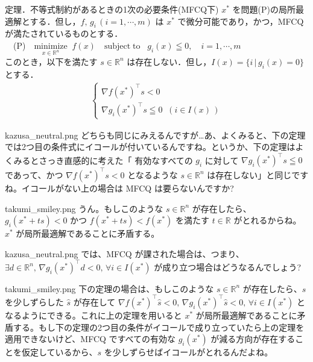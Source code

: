 \documentclass[b5paper,xelatex,ja=standard,10pt]{bxjsarticle}
\begin{document}
\begin{PROP}[colback=White]{定理．不等式制約があるときの1次の必要条件(MFCQ下)}
$x^\ast$ を問題(P)の局所最適解とする．但し，$f, \, g_i \, (i = 1, \cdots, m)$ は $x^\ast$ で微分可能であり，かつ，MFCQ が満たされているものとする．
\\[3pt]
　(P)　$\displaystyle \underset{x \in \mathbb{R}^n}{\mathrm{minimize}} \; \; f(x)  \quad  \mathrm{subject \; to}   \; \; \; g_i(x) \leqq 0,  \quad i = 1, \cdots, m $
\\[3pt]
このとき，以下を満たす $s \in \mathbb{R}^n$ は存在しない．但し，$I(x) = \{i \, | \, g_i(x) = 0\}$ とする．
\begin{eqnarray*}
\left\{
\begin{array}{l}
\displaystyle \nabla f (x^\ast) ^\top s < 0  \\[5pt]
\nabla g_i (x^\ast) ^\top s \leqq 0  \; \; (i \in I(x) \, )
\end{array}
\right.
\end{eqnarray*}
\end{PROP}

\begin{SERIFU}[colback=PaleIris, colbacktitle=PaleIris2]{kazusa_neutral.png}
どちらも同じにみえるんですが…あ、よくみると、下の定理では2つ目の条件式にイコールが付いているんですね。というか、下の定理はよくみるとさっき直感的に考えた「 有効なすべての $g_i$ に対して $\nabla g_i(x^\ast)^\top s \leqq 0$ であって、かつ $\nabla f(x^\ast)^\top s < 0$ となるような $s \in \mathbb{R}^n$ は存在しない」と同じですね。イコールがない上の場合は MFCQ は要らないんですか?
\end{SERIFU}

\begin{SERIFU}[colback=PaleGold, colbacktitle=PaleGold2]{takumi_smiley.png}
うん。もしこのような $s \in \mathbb{R}^n$ が存在したら、$g_i(x^\ast + ts) < 0$ かつ $f(x^\ast + ts) < f(x^\ast)$ を満たす $t \in \mathbb{R}$ がとれるからね。$x^\ast$ が局所最適解であることに矛盾する。
\end{SERIFU}

\begin{SERIFU}[colback=PaleIris, colbacktitle=PaleIris2]{kazusa_neutral.png}
では、MFCQ が課された場合は、つまり、$\exists d \in \mathbb{R}^n, \, \nabla g_i(x^\ast) ^\top d < 0, \, \forall i \in I(x^\ast)$ が成り立つ場合はどうなるんでしょう?
\end{SERIFU}

\begin{SERIFU}[colback=PaleGold, colbacktitle=PaleGold2]{takumi_smiley.png}
下の定理の場合は、もしこのような $s \in \mathbb{R}^n$ が存在したら、$s$ を少しずらした $\hat{s}$ が存在して $\nabla f(x^\ast) ^\top \hat{s} < 0, \, \nabla g_i(x^\ast) ^\top \hat{s} < 0, \, \forall i \in I(x^\ast)$ となるようにできる。これに上の定理を用いると $x^\ast$ が局所最適解であることに矛盾する。もし下の定理の2つ目の条件がイコールで成り立っていたら上の定理を適用できないけど、MFCQ ですべての有効な $g_i(x^\ast)$ が減る方向が存在することを仮定しているから、$s$ を少しずらせばイコールがとれるんだよね。
\end{SERIFU}
\end{document}
